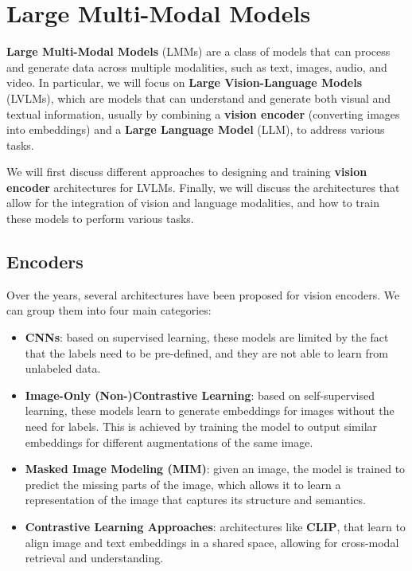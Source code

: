 \section{Large Multi-Modal Models}

\textbf{Large Multi-Modal Models} (LMMs) are a class of models that can process and generate data across multiple modalities, such as text, images, audio, and video. 
In particular, we will focus on \textbf{Large Vision-Language Models} (LVLMs), which are models that can understand and generate both visual and textual information, 
usually by combining a \textbf{vision encoder} (converting images into embeddings) and a \textbf{Large Language Model} (LLM), to address various tasks.

We will first discuss different approaches to designing and training \textbf{vision encoder} architectures for LVLMs.
Finally, we will discuss the architectures that allow for the integration of vision and language modalities, and how to train these models to perform various tasks.

\subsection{Encoders}
Over the years, several architectures have been proposed for vision encoders. We can group them into four main categories: 
\begin{itemize}
    \item \textbf{CNNs}: based on supervised learning, these models are limited by the fact that the labels need to be pre-defined, and they are not able to learn from unlabeled data.
    \item \textbf{Image-Only (Non-)Contrastive Learning}: based on self-supervised learning, these models learn to generate embeddings for images without the need for labels.
    This is achieved by training the model to output similar embeddings for different augmentations of the same image.
    \item \textbf{Masked Image Modeling (MIM)}: given an image, the model is trained to predict the missing parts of the image, which allows it to learn a representation of the image that captures its structure and semantics.
    \item \textbf{Contrastive Learning Approaches}: architectures like \textbf{CLIP}, that learn to align image and text embeddings in a shared space, allowing for cross-modal retrieval and understanding.
\end{itemize}

